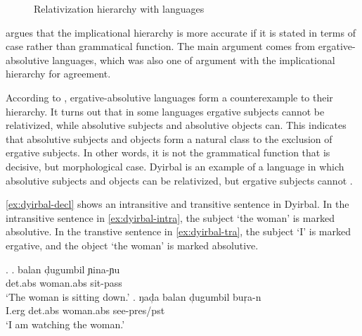  \begin{figure}[H]
   \centering
   \caption{Relativization hierarchy with languages}
   \label{fig:rel-sub-do-io-lang}
 \end{figure}

\citet{caha2009} argues that the implicational hierarchy is more accurate if it is stated in terms of case rather than grammatical function. The main argument comes from ergative-absolutive languages, which was also one of  argument with the implicational hierarchy for agreement.

According to \citet{keenan1977}, ergative-absolutive languages form a counterexample to their hierarchy. It turns out that in some languages ergative subjects cannot be relativized, while absolutive subjects and absolutive objects can. This indicates that absolutive subjects and objects form a natural class to the exclusion of ergative subjects. In other words, it is not the grammatical function that is decisive, but morphological case. Dyirbal is an example of a language in which absolutive subjects and objects can be relativized, but ergative subjects cannot .

\ref{ex:dyirbal-decl} shows an intransitive and transitive sentence in Dyirbal. In the intransitive sentence in \ref{ex:dyirbal-intra}, the subject  `the woman' is marked absolutive. In the transtive sentence in \ref{ex:dyirbal-tra}, the subject  `I' is marked ergative, and the object  `the woman' is marked absolutive.

\ex.\label{ex:dyirbal-decl}
\ag. balan d̦ugumbil ɲina-ɲu\\
 \ac{det}.\ac{abs} woman.\ac{abs} sit-\ac{pass}\\
 `The woman is sitting down.'\label{ex:dyirbal-intra}
\bg. ŋad̦a balan d̦ugumbil buŗa-n\\
 I.\ac{erg} \ac{det}.\ac{abs} woman.\ac{abs} see-\ac{pres}/\ac{pst}\\
 `I am watching the woman.'\label{ex:dyirbal-tra}

